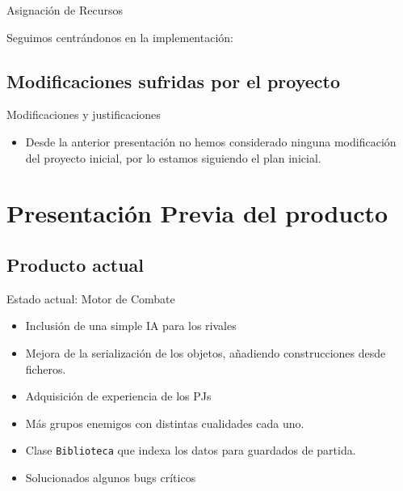 \documentclass[9pt,xcolor=svgnames]{beamer}
\begin{document}
  
  \begin{frame}{Asignación de Recursos}
   
   Seguimos centrándonos en la implementación:
   
    
  \end{frame}
   
   
   
   \subsection{Modificaciones sufridas por el proyecto}
   
   \begin{frame}{Modificaciones y justificaciones}
    
    \begin{itemize}
     \item Desde la anterior presentación no hemos considerado
	   ninguna modificación del proyecto inicial, por lo
	   estamos siguiendo el plan inicial.
	 
     \end{itemize}
    
    
   \end{frame}
   
   
 \section{Presentación Previa del producto}
 
   \subsection{Producto actual}

   \begin{frame}{Estado actual: Motor de Combate}
    \begin{itemize}
     \item Inclusión de una simple IA para los rivales
     \item Mejora de la serialización de los objetos, añadiendo
	   construcciones desde ficheros.
     \item Adquisición de experiencia de los PJs
     \item Más grupos enemigos con distintas cualidades cada uno.
     \item Clase \texttt{Biblioteca} que indexa los datos para 
	   guardados de partida.
     \item Solucionados algunos bugs críticos
    \end{itemize}
   \end{frame}
\end{document}
